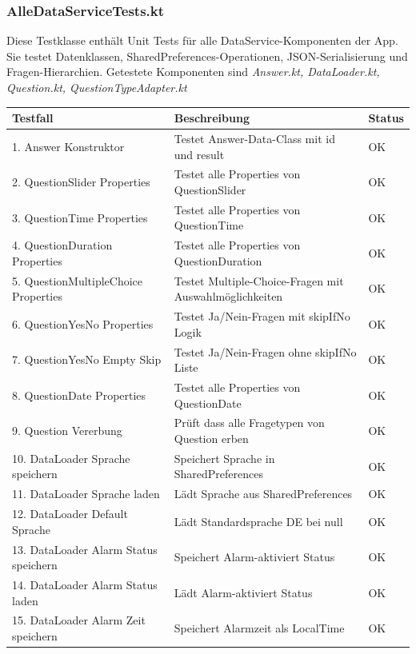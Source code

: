 \documentclass[a4paper,12pt]{article}
\begin{document}
\subsubsection{AlleDataServiceTests.kt}
Diese Testklasse enthält Unit Tests für alle DataService-Komponenten der App. Sie testet Datenklassen, SharedPreferences-Operationen, JSON-Serialisierung und Fragen-Hierarchien.
Getestete Komponenten sind \textit{Answer.kt, DataLoader.kt, Question.kt, QuestionTypeAdapter.kt}\\
\begin{tabularx}{\textwidth}{|l|X|l|}
\hline
\textbf{Testfall} & \textbf{Beschreibung} & \textbf{Status} \\
\hline
1. Answer Konstruktor & Testet Answer-Data-Class mit id und result & OK \\
\hline
2. QuestionSlider Properties & Testet alle Properties von QuestionSlider & OK \\
\hline
3. QuestionTime Properties & Testet alle Properties von QuestionTime & OK \\
\hline
4. QuestionDuration Properties & Testet alle Properties von QuestionDuration & OK \\
\hline
5. QuestionMultipleChoice Properties & Testet Multiple-Choice-Fragen mit Auswahlmöglichkeiten & OK \\
\hline
6. QuestionYesNo Properties & Testet Ja/Nein-Fragen mit skipIfNo Logik & OK \\
\hline
7. QuestionYesNo Empty Skip & Testet Ja/Nein-Fragen ohne skipIfNo Liste & OK \\
\hline
8. QuestionDate Properties & Testet alle Properties von QuestionDate & OK \\
\hline
9. Question Vererbung & Prüft dass alle Fragetypen von Question erben & OK \\
\hline
10. DataLoader Sprache speichern & Speichert Sprache in SharedPreferences & OK \\
\hline
11. DataLoader Sprache laden & Lädt Sprache aus SharedPreferences & OK \\
\hline
12. DataLoader Default Sprache & Lädt Standardsprache DE bei null & OK \\
\hline
13. DataLoader Alarm Status speichern & Speichert Alarm-aktiviert Status & OK \\
\hline
14. DataLoader Alarm Status laden & Lädt Alarm-aktiviert Status & OK \\
\hline
15. DataLoader Alarm Zeit speichern & Speichert Alarmzeit als LocalTime & OK \\

\end{tabularx}
\end{document}
